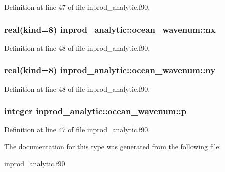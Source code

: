 Definition at line 47 of file inprod\-\_\-analytic.\-f90.

\hypertarget{structinprod__analytic_1_1ocean__wavenum_a6084ea7c554f942e74779a2be38b7d3d}{
\subsubsection[{nx}]{\setlength{\rightskip}{0pt plus 5cm}real(kind=8) inprod\-\_\-analytic\-::ocean\-\_\-wavenum\-::nx\hspace{0.3cm}{\ttfamily [private]}}}\label{structinprod__analytic_1_1ocean__wavenum_a6084ea7c554f942e74779a2be38b7d3d}


Definition at line 48 of file inprod\-\_\-analytic.\-f90.

\hypertarget{structinprod__analytic_1_1ocean__wavenum_a0738c305f503d7864a9073c5cea352ab}{
\subsubsection[{ny}]{\setlength{\rightskip}{0pt plus 5cm}real(kind=8) inprod\-\_\-analytic\-::ocean\-\_\-wavenum\-::ny\hspace{0.3cm}{\ttfamily [private]}}}\label{structinprod__analytic_1_1ocean__wavenum_a0738c305f503d7864a9073c5cea352ab}


Definition at line 48 of file inprod\-\_\-analytic.\-f90.

\hypertarget{structinprod__analytic_1_1ocean__wavenum_a3170ff1b2a81b58ae81527a964682c06}{
\subsubsection[{p}]{\setlength{\rightskip}{0pt plus 5cm}integer inprod\-\_\-analytic\-::ocean\-\_\-wavenum\-::p\hspace{0.3cm}{\ttfamily [private]}}}\label{structinprod__analytic_1_1ocean__wavenum_a3170ff1b2a81b58ae81527a964682c06}


Definition at line 47 of file inprod\-\_\-analytic.\-f90.



The documentation for this type was generated from the following file\-:\begin{DoxyCompactItemize}
\item 
\hyperlink{inprod__analytic_8f90}{inprod\-\_\-analytic.\-f90}\end{DoxyCompactItemize}
